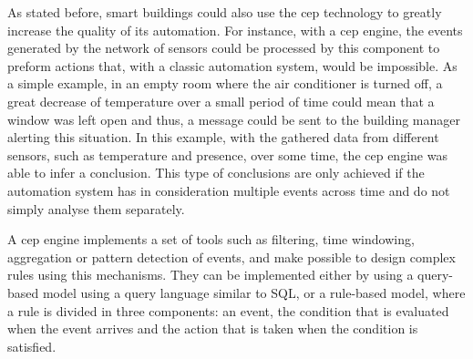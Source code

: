 As stated before, smart buildings could also use the \ac{cep} technology to greatly increase the quality of its automation. For instance, with a \ac{cep} engine, the events generated by the network of sensors could be processed by this component to preform actions that, with a classic automation system, would be impossible. As a simple example, in an empty room where the air conditioner is turned off, a great decrease of temperature over a small period of time could mean that a window was left open and thus, a message could be sent to the building manager alerting this situation. In this example, with the gathered data from different sensors, such as temperature and presence, over some time, the \acf{cep} engine was able to infer a conclusion. This type of conclusions are only achieved if the automation system has in consideration multiple events across time and do not simply analyse them separately.

A \ac{cep} engine implements a set of tools such as filtering, time windowing, aggregation or pattern detection of events, and make possible to design complex rules using this mechanisms. They can be implemented either by using a query-based model using a query language similar to SQL, or a rule-based model, where a rule is divided in three components: an event, the condition that is evaluated when the event arrives and the action that is taken when the condition is satisfied.



